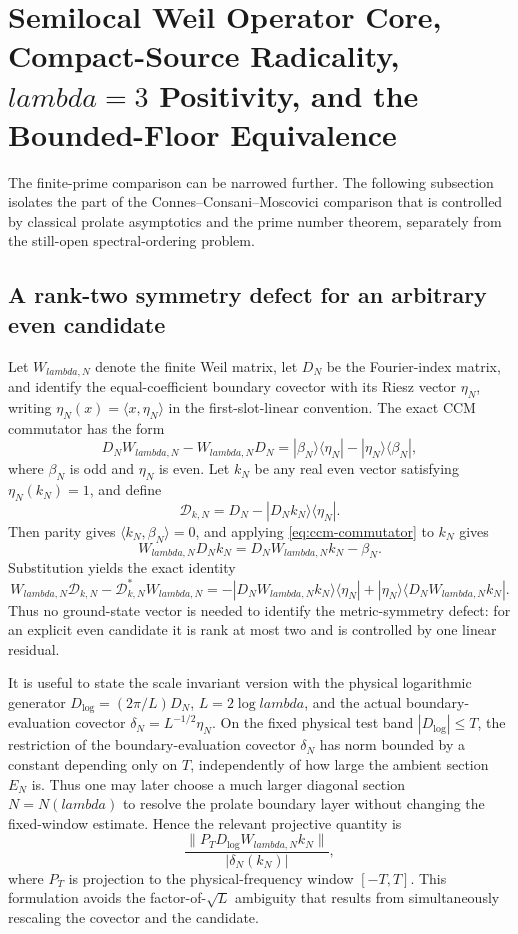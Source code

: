 \documentclass[11pt]{article}
\def\lambda{lambda}%
\theoremstyle{remark}
\begin{document}
\section{Semilocal Weil Operator Core, Compact-Source Radicality, \texorpdfstring{$\lambda=3$}{lambda=3} Positivity, and the Bounded-Floor Equivalence}\label{sec:g1}
The finite-prime comparison can be narrowed further.  The following subsection isolates the part of the Connes--Consani--Moscovici comparison that is controlled by classical prolate asymptotics and the prime number theorem, separately from the still-open spectral-ordering problem.

\subsection{A rank-two symmetry defect for an arbitrary even candidate}
Let $W_{\lambda,N}$ denote the finite Weil matrix, let $D_N$ be the Fourier-index matrix, and identify the equal-coefficient boundary covector with its Riesz vector $\eta_N$, writing $\eta_N(x)=\langle x,\eta_N\rangle$ in the first-slot-linear convention.  The exact CCM commutator has the form
\begin{equation}\label{eq:ccm-commutator}
 D_NW_{\lambda,N}-W_{\lambda,N}D_N
 =|\beta_N\rangle\langle\eta_N|-|\eta_N\rangle\langle\beta_N|,
\end{equation}
where $\beta_N$ is odd and $\eta_N$ is even.  Let $k_N$ be any real even vector satisfying $\eta_N(k_N)=1$, and define
\[
 \mathcal D_{k,N}=D_N-|D_Nk_N\rangle\langle\eta_N|.
\]
Then parity gives $\langle k_N,\beta_N\rangle=0$, and applying \eqref{eq:ccm-commutator} to $k_N$ gives
\[
 W_{\lambda,N}D_Nk_N=D_NW_{\lambda,N}k_N-\beta_N.
\]
Substitution yields the exact identity
\begin{equation}\label{eq:ranktwo-weil-defect}
 \boxed{
 W_{\lambda,N}\mathcal D_{k,N}
 -\mathcal D_{k,N}^{*}W_{\lambda,N}
 =-|D_NW_{\lambda,N}k_N\rangle\langle\eta_N|
  +|\eta_N\rangle\langle D_NW_{\lambda,N}k_N|.}
\end{equation}
Thus no ground-state vector is needed to identify the metric-symmetry defect: for an explicit even candidate it is rank at most two and is controlled by one linear residual.

It is useful to state the scale invariant version with the physical logarithmic generator $D_{\log}=(2\pi/L)D_N$, $L=2\log\lambda$, and the actual boundary-evaluation covector $\delta_N=L^{-1/2}\eta_N$.  On the fixed physical test band $|D_{\log}|\le T$, the restriction of the boundary-evaluation covector $\delta_N$ has norm bounded by a constant depending only on $T$, independently of how large the ambient section $E_N$ is.  Thus one may later choose a much larger diagonal section $N=N(\lambda)$ to resolve the prolate boundary layer without changing the fixed-window estimate.  Hence the relevant projective quantity is
\begin{equation}\label{eq:physical-projective-residual}
 \frac{\|P_TD_{\log}W_{\lambda,N}k_N\|}
 {|\delta_N(k_N)|},
\end{equation}
where $P_T$ is projection to the physical-frequency window $[-T,T]$.  This formulation avoids the factor-of-$\sqrt L$ ambiguity that results from simultaneously rescaling the covector and the candidate.
\end{document}
